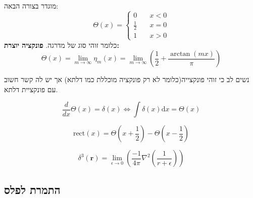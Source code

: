 \documentclass{tstextbook}
\begin{document}
\begin{definition}
מוגדר בצורה הבאה:
$$ \Theta\left(x\right)=\begin{cases}0&\quad x<0\\\frac{1}{2}&\quad x=0\\1&\quad x>0\end{cases}$$
כלומר זוהי סוג של מדרגה. 
\textbf{פונקציה יוצרת:}$$ \Theta(x)=\lim\limits_{m\to\infty}\eta_m(x)=\lim\limits_{m\to\infty}\left(\frac{1}{2}+\frac{\arctan(mx)}{\pi}\right)$$

\end{definition}
נשים לב כי זוהי פונקצייה(כלומר לא רק פונקציה מוכללת כמו דלתא) אך יש לה קשר חשוב עם פונקציית דלתא.

\begin{proposition}
$$\frac{d}{dx}\Theta(x)=\delta(x) \iff \int\delta(x)\mathrm{d}x=\Theta(x)$$

\end{proposition}
\begin{proposition}
$$\mathrm{rect}\left( x \right)=\Theta\left( x+\frac{1}{2} \right)-\Theta\left( x-\frac{1}{2} \right)$$

\end{proposition}
\begin{definition}
$$\delta^{3}(\mathbf{r})=\operatorname*{lim}_{\epsilon\to0}\left({\frac{-1}{4\pi}}\nabla^{2}\left({\frac{1}{r+\epsilon}}\right)\right)$$

\end{definition}
\subsection{התמרת לפלס}
\end{document}
